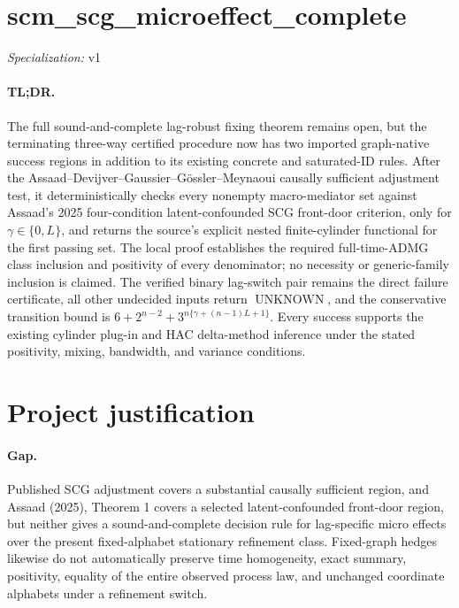 \documentclass{article}
\begin{document}
\sloppy

\section*{scm\_\allowbreak{}scg\_\allowbreak{}microeffect\_\allowbreak{}complete}

\noindent\textit{Specialization:} v1\par

\paragraph{TL;DR.} The full sound-and-complete lag-robust fixing theorem remains open, but the terminating three-way certified procedure now has two imported graph-native success regions in addition to its existing concrete and saturated-ID rules. After the Assaad--Devijver--Gaussier--Gössler--Meynaoui causally sufficient adjustment test, it deterministically checks every nonempty macro-mediator set against Assaad's 2025 four-condition latent-confounded SCG front-door criterion, only for \(\gamma\in\{0,L\}\), and returns the source's explicit nested finite-cylinder functional for the first passing set. The local proof establishes the required full-time-ADMG class inclusion and positivity of every denominator; no necessity or generic-family inclusion is claimed. The verified binary lag-switch pair remains the direct failure certificate, all other undecided inputs return \(\operatorname{UNKNOWN}\), and the conservative transition bound is \(6+2^{n-2}+3^{n\{\gamma+(n-1)L+1\}}\). Every success supports the existing cylinder plug-in and HAC delta-method inference under the stated positivity, mixing, bandwidth, and variance conditions.

\section{Project justification}

\paragraph{Gap.} Published SCG adjustment covers a substantial causally sufficient region, and Assaad (2025), Theorem 1 covers a selected latent-confounded front-door region, but neither gives a sound-and-complete decision rule for lag-specific micro effects over the present fixed-alphabet stationary refinement class. Fixed-graph hedges likewise do not automatically preserve time homogeneity, exact summary, positivity, equality of the entire observed process law, and unchanged coordinate alphabets under a refinement switch.
\end{document}

